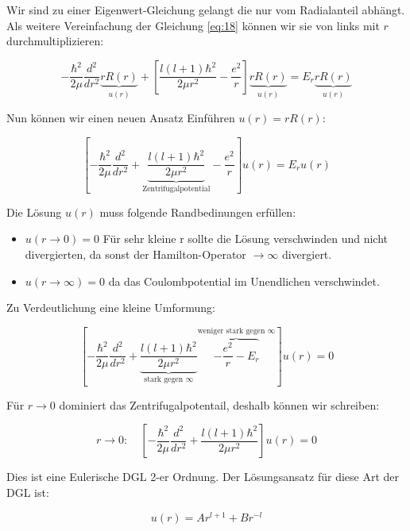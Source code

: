 Wir sind zu einer Eigenwert-Gleichung gelangt die nur vom Radialanteil abhängt. Als weitere Vereinfachung der Gleichung \eqref{eq:18} können wir sie von links mit \(r\) durchmultiplizieren:

\begin{equation}
  \label{eq:19}
   - \frac{\hbar^2}{2\mu}\frac{d^2}{dr^2}\underbrace{r R(r)}_{u(r)} + \left[\frac{l(l+1)\hbar^2}{2\mu r^2}  - \frac{e^2}{r}\right] \underbrace{r R(r)}_{u(r)}   = E_r \underbrace{r R(r)}_{u(r)}
\end{equation}

Nun können wir einen neuen Ansatz Einführen \(u(r) = rR(r)\):

\begin{equation}
  \label{eq:20}
    \left[-\frac{\hbar^2}{2\mu}\frac{d^2}{dr^2} + \underbrace{\frac{l(l+1)\hbar^2}{2\mu r^2}}_{\text{Zentrifugalpotential}}  - \frac{e^2}{r}\right] u(r)   = E_r u(r)
\end{equation}

Die Lösung \(u(r)\) muss folgende Randbedinungen erfüllen:

\begin{itemize}
\item \(u(r \to 0)=0  \) Für sehr kleine r sollte die Lösung verschwinden und nicht divergierten, da sonst der Hamilton-Operator \(\to\infty\) divergiert.
\item  \(u(r \to \infty)=0  \) da das Coulombpotential im Unendlichen verschwindet.
\end{itemize}

Zu Verdeutlichung eine kleine Umformung:

\begin{equation}
  \label{eq:22}
   \left[-\frac{\hbar^2}{2\mu}\frac{d^2}{dr^2} + \underbrace{\frac{l(l+1)\hbar^2}{2\mu r^2}}_{\text{stark gegen }\infty}  \overbrace{- \frac{e^2}{r} - E_r}^{\text{weniger stark gegen }\infty}   \right] u(r)   = 0 
\end{equation}

Für \(r\to 0\) dominiert das Zentrifugalpotentail, deshalb können wir schreiben:

\begin{equation}
  \label{eq:21}
  r\to 0: \quad\left[-\frac{\hbar^2}{2\mu}\frac{d^2}{dr^2}+ \frac{l(l+1)\hbar^2}{2\mu r^2}\right] u(r) = 0
\end{equation}

Dies ist eine Eulerische DGL 2-er Ordnung. Der Lösungsansatz für diese Art der DGL ist:

\begin{equation}
  \label{eq:23}
  u(r) = Ar^{l+1}+Br^{-l}
\end{equation}

